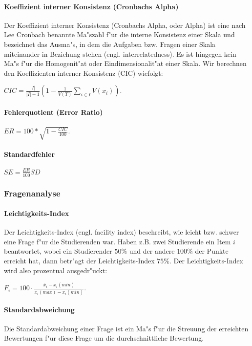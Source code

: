\documentclass[12pt]{report}
\begin{document}
\paragraph{Koeffizient interner Konsistenz (Cronbachs Alpha)}
Der Koeffizient interner Konsistenz (Cronbachs Alpha, oder Alpha) ist eine nach Lee Cronbach benannte Ma"szahl f"ur die interne Konsistenz einer Skala und bezeichnet das Ausma"s, in dem die Aufgaben bzw. Fragen einer Skala miteinander in Beziehung stehen (engl. interrelatedness). Es ist hingegen kein Ma"s f"ur die Homogenit"at oder Eindimensionalit"at einer Skala. Wir berechnen den Koeffizienten interner Konsistenz (CIC) wiefolgt:

$CIC=\frac{|I|}{|I|-1}\left(1-\frac{1}{V(T)}\sum\limits_{i\in I}V(x_i)\right)$.

\paragraph{Fehlerquotient (Error Ratio)}

$ER=100*\sqrt{1-\frac{CIC}{100}}$.

\paragraph{Standardfehler}

$SE=\frac{ER}{100}SD$


\subsubsection{Fragenanalyse}
\label{subsubsec:questions}

\paragraph{Leichtigkeits-Index}
Der Leichtigkeits-Index (engl. facility index) beschreibt, wie leicht bzw. schwer eine Frage f"ur die Studierenden war. 
Haben z.B. zwei Studierende ein Item $i$ beantwortet, wobei ein Studierender $50\%$ und der andere $100\%$ der Punkte erreicht hat, dann betr"agt der Leichtigkeits-Index $75\%$. Der Leichtigkeits-Index wird also prozentual ausgedr"uckt:

$F_i = 100\cdot\frac{\bar{x}_i - x_i(min)}{x_i(max) - x_i(min)}$. 

\paragraph{Standardabweichung}
Die Standardabweichung einer Frage ist ein Ma"s f"ur die Streuung der erreichten Bewertungen f"ur diese Frage um die durchschnittliche Bewertung. 
\end{document}
